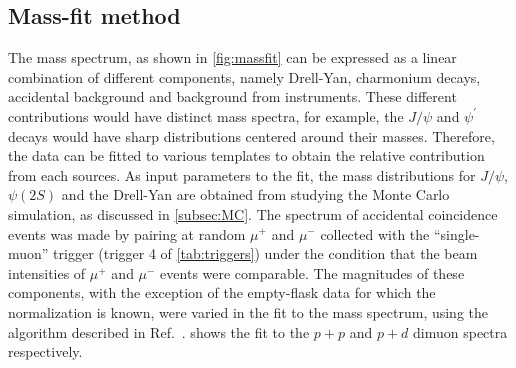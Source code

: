 \documentclass[reprint,aps,unsortedaddress,superscriptaddress,prc,floatfix,showpacs,linenumbers]{revtex4-2}
\begin{document}
\subsection{Mass-fit method}
The mass spectrum, as shown in \cref{fig:massfit} can be expressed as a linear combination of different components,
namely Drell-Yan, charmonium decays, accidental background and background from instruments.
These different contributions would have distinct mass spectra, for example, the $J/\psi$
and $\psi^\prime$ decays would have sharp distributions centered around their masses.
Therefore, the data can be fitted to various templates to obtain
the relative contribution from each sources. 
As input parameters to the fit, the mass distributions for $J/\psi$, $\psi\left(2S\right)$ 
and the Drell-Yan are obtained from studying the Monte Carlo simulation, as discussed in \cref{subsec:MC}.
The spectrum of accidental coincidence events was made by pairing at random $\mu^+$ and $\mu^-$ collected with the ``single-muon'' trigger (trigger 4 of \cref{tab:triggers})
under the condition that the beam intensities of $\mu^+$ and $\mu^-$ events were comparable.
The magnitudes of these components,
with the exception of the empty-flask data for which the normalization is known,
were varied in the fit to the mass spectrum, using the algorithm described in Ref.~\cite{barlow1993}.
 shows the fit to the $p+p$ and $p+d$ dimuon spectra respectively.
\end{document}
